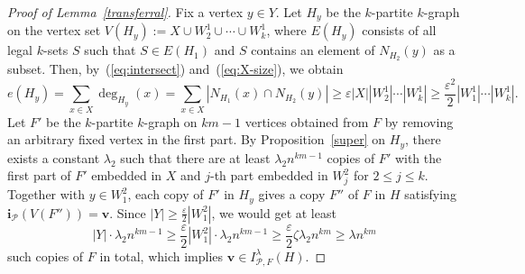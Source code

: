 \documentclass[10pt,a4paper]{amsart}
\begin{document}
\begin{proof}[Proof of Lemma~\ref{transferral}]
Fix a vertex $y\in Y$. Let $H_y$ be the $k$-partite $k$-graph on the vertex set $V(H_y):=X\cup W_2^1\cup\cdots \cup W_k^1$, where $E(H_y)$ consists of all legal $k$-sets $S$ such that $S\in E(H_1)$ and $S$ contains an element of $N_{H_2}(y)$ as a subset. Then, by~(\ref{eq:intersect}) and~(\ref{eq:X-size}), we obtain
\[
e(H_y)=\sum_{x\in X}\deg_{H_y}(x)=\sum_{x\in X}|N_{H_1}(x)\cap N_{H_2}(y)|\ge \varepsilon |X||W_2^1|\cdots |W_k^1|\ge \frac{\varepsilon^2}{2}|W_1^1|\cdots |W_k^1|.
\]
Let $F'$ be the $k$-partite $k$-graph on $km-1$ vertices obtained from $F$ by removing an arbitrary fixed vertex in the first part. By Proposition~\ref{super} on $H_y$, there exists a constant $\lambda_2$ such that there are at least $\lambda_2n^{km-1}$ copies of $F'$ with the first part of $F'$ embedded in $X$ and $j$-th part embedded in $W_j^2$ for $2\le j\le k$. Together with $y\in W_1^2$, each copy of $F'$ in $H_y$ gives a copy $F''$ of $F$ in $H$ satisfying $\mathbf{i}_{\mathcal{P}}(V(F''))=\mathbf{v}$. Since $|Y|\ge \frac{\varepsilon}{2}|W_1^2|$, we would get at least
\[
|Y|\cdot \lambda_2n^{km-1}\ge \frac{\varepsilon}{2}|W_1^2|\cdot \lambda_2n^{km-1}\ge \frac{\varepsilon}{2}\zeta \lambda_2n^{km}\ge \lambda n^{km}
\]
such copies of $F$ in total, which implies $\mathbf{v}\in I^{\lambda}_{\mathcal{P},F}(H)$.





    
\end{proof}
\end{document}
